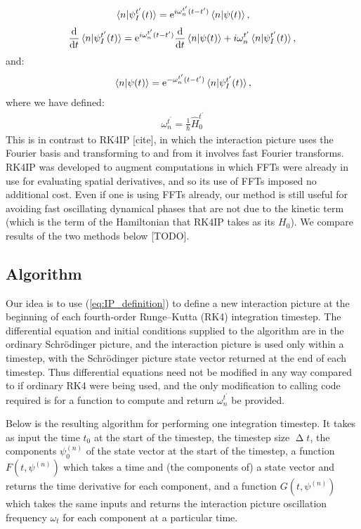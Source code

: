 \begin{align}\label{eq:IP_definition_components}
\braket{n}{\psi_I^{t^\prime}(t)} = \e^{ i \omega_n^{t^\prime}(t - t^\prime)}\braket{n}{\psi(t)},
\end{align}
\begin{align}\label{eq:IPDE_components}
\dv t \braket{n}{\psi_I^{t^\prime}(t)}
    = \e^{i \omega_n^{t^\prime}(t - t^\prime)}\dv t \braket{n}{\psi(t)}
      + i\omega_n^{t^\prime}\braket{n}{\psi_I^{t^\prime}(t)},
\end{align}
and:
\begin{align}\label{eq:backtransform_components}
\braket{n}{\psi(t)} = \e^{-\omega_n^{t^\prime}(t - t^\prime)}\braket{n}{\psi_I^{t^\prime}(t)},
\end{align}
where we have defined:
\begin{align}\label{eq:omega}
\omega_n^{t^\prime} = \frac 1\hbar \hat H_0^{t^\prime}
\end{align}
This is in contrast to RK4IP [cite], in which the interaction picture uses the Fourier basis and transforming to and from it involves fast Fourier transforms. RK4IP was developed to augment computations in which FFTs were already in use for evaluating spatial derivatives, and so its use of FFTs imposed no additional cost. Even if one is using FFTs already, our method is still useful for avoiding fast oscillating dynamical phases that are not due to the kinetic term (which is the term of the Hamiltonian that RK4IP takes as its $H_0$). We compare results of the two methods below [TODO].

\subsection{Algorithm}
Our idea is to use (\ref{eq:IP_definition}) to define a new interaction picture at the beginning of each fourth-order Runge–Kutta (RK4) integration timestep. The differential equation and initial conditions supplied to the algorithm are in the ordinary Schrödinger picture, and the interaction picture is used only within a timestep, with the Schrödinger picture state vector returned at the end of each timestep. Thus differential equations need not be modified in any way compared to if ordinary RK4 were being used, and the only modification to calling code required is for a function to compute and return $\omega_n^{t^\prime}$ be provided.

Below is the resulting algorithm for performing one integration timestep. It takes as input the time $t_0$ at the start of the timestep, the timestep size $\upDelta t$, the components $\psi_0^{(n)}$ of the state vector at the start of the timestep, a function $F(t, \psi^{(n)})$ which takes a time and (the components of) a state vector and returns the time derivative for each component, and a function $G(t, \psi^{(n)})$ which takes the same inputs and returns the interaction picture oscillation frequency $\omega_{t}$ for each component at a particular time.

